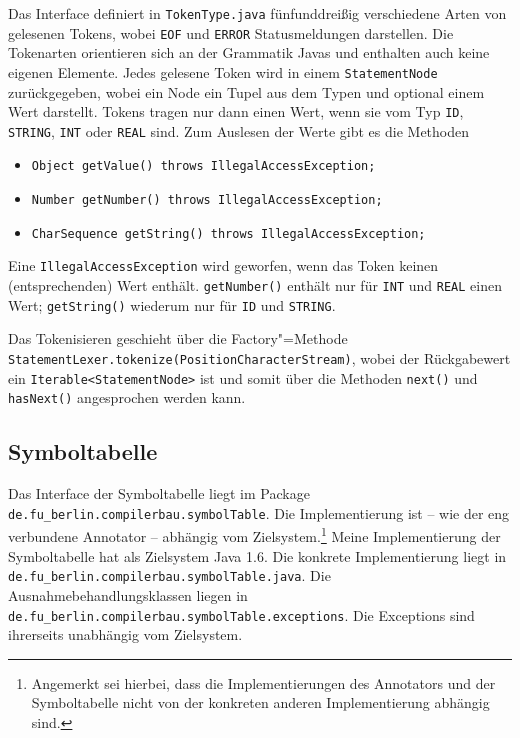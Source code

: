 \documentclass[10pt,a4paper,ngerman,titlepage,tocindentauto]{scrartcl}
\newcommand{\n}{\linebreak[1]}
\begin{document}
			Das Interface definiert in \texttt{TokenType.java} fünfunddreißig verschiedene Arten von gelesenen Tokens,
			wobei \texttt{EOF} und \texttt{ERROR} Statusmeldungen darstellen. Die Tokenarten orientieren sich
			an der Grammatik Javas und enthalten auch keine eigenen Elemente. Jedes gelesene Token wird in einem
			\texttt{StatementNode} zurückgegeben, wobei ein Node ein Tupel aus dem Typen und optional einem Wert
			darstellt.
			Tokens tragen nur dann einen Wert, wenn sie vom Typ \texttt{ID}, \texttt{STRING}, \texttt{INT} oder
			\texttt{REAL} sind. Zum Auslesen der Werte gibt es die Methoden
			\begin{itemize}
				\item \texttt{Object getValue() throws IllegalAccessException;}
				\item \texttt{Number getNumber() throws IllegalAccessException;}
				\item \texttt{CharSequence getString() throws IllegalAccessException;}
			\end{itemize}
			Eine \texttt{IllegalAccessException} wird geworfen, wenn das Token keinen (entsprechenden)
			Wert enthält. \texttt{getNumber()} enthält nur für \texttt{INT} und \texttt{REAL} einen Wert;
			\texttt{getString()} wiederum nur für \texttt{ID} und \texttt{STRING}.
			
			Das Tokenisieren geschieht über die Factory"=Methode \texttt{StatementLexer.tokenize(PositionCharacterStream)},
			wobei der Rückgabewert ein \texttt{Iterable<StatementNode>} ist und somit über die Methoden \texttt{next()} und
			\texttt{hasNext()} angesprochen werden kann.
	
		\subsection{Symboltabelle}
			Das Interface der Symboltabelle liegt im Package \texttt{de.{\n}fu\_berlin.{\n}compilerbau.{\n}symbolTable}.
			Die Implementierung ist -- wie der eng verbundene Annotator -- abhängig vom Zielsystem.\footnote
			{Angemerkt sei hierbei, dass die Implementierungen des Annotators und der Symboltabelle nicht von
			der konkreten anderen Implementierung abhängig sind.}
			Meine Implementierung der Symboltabelle hat als Zielsystem Java 1.6. Die konkrete Implementierung
			liegt in \texttt{de.{\n}fu\_berlin.{\n}compilerbau.{\n}symbolTable.{\n}java}. Die Ausnahmebehandlungsklassen
			liegen in \texttt{de.{\n}fu\_berlin.{\n}compilerbau.{\n}symbolTable.{\n}exceptions}. Die Exceptions sind
			ihrerseits unabhängig vom Zielsystem.
			
\end{document}
